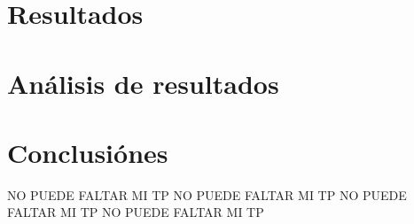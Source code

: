 \documentclass[]{article}
\begin{document}
\begin{multicols}{2}
\section{Resultados}

\section{Análisis de resultados}

\section{Conclusiónes}
NO PUEDE FALTAR MI TP NO PUEDE FALTAR MI TP
NO PUEDE FALTAR MI TP NO PUEDE FALTAR MI TP

\printbibliography

\end{multicols}
\end{document}
